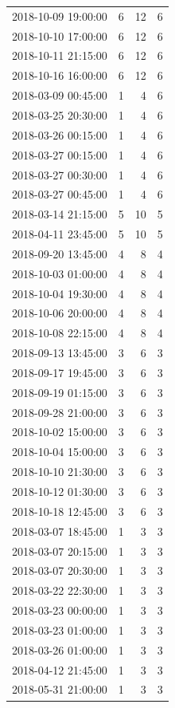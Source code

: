 \begin{tabular}{lrrr}
2018-10-09 19:00:00 & 6 & 12 & 6 \\
2018-10-10 17:00:00 & 6 & 12 & 6 \\
2018-10-11 21:15:00 & 6 & 12 & 6 \\
2018-10-16 16:00:00 & 6 & 12 & 6 \\
2018-03-09 00:45:00 & 1 & 4 & 6 \\
2018-03-25 20:30:00 & 1 & 4 & 6 \\
2018-03-26 00:15:00 & 1 & 4 & 6 \\
2018-03-27 00:15:00 & 1 & 4 & 6 \\
2018-03-27 00:30:00 & 1 & 4 & 6 \\
2018-03-27 00:45:00 & 1 & 4 & 6 \\
2018-03-14 21:15:00 & 5 & 10 & 5 \\
2018-04-11 23:45:00 & 5 & 10 & 5 \\
2018-09-20 13:45:00 & 4 & 8 & 4 \\
2018-10-03 01:00:00 & 4 & 8 & 4 \\
2018-10-04 19:30:00 & 4 & 8 & 4 \\
2018-10-06 20:00:00 & 4 & 8 & 4 \\
2018-10-08 22:15:00 & 4 & 8 & 4 \\
2018-09-13 13:45:00 & 3 & 6 & 3 \\
2018-09-17 19:45:00 & 3 & 6 & 3 \\
2018-09-19 01:15:00 & 3 & 6 & 3 \\
2018-09-28 21:00:00 & 3 & 6 & 3 \\
2018-10-02 15:00:00 & 3 & 6 & 3 \\
2018-10-04 15:00:00 & 3 & 6 & 3 \\
2018-10-10 21:30:00 & 3 & 6 & 3 \\
2018-10-12 01:30:00 & 3 & 6 & 3 \\
2018-10-18 12:45:00 & 3 & 6 & 3 \\
2018-03-07 18:45:00 & 1 & 3 & 3 \\
2018-03-07 20:15:00 & 1 & 3 & 3 \\
2018-03-07 20:30:00 & 1 & 3 & 3 \\
2018-03-22 22:30:00 & 1 & 3 & 3 \\
2018-03-23 00:00:00 & 1 & 3 & 3 \\
2018-03-23 01:00:00 & 1 & 3 & 3 \\
2018-03-26 01:00:00 & 1 & 3 & 3 \\
2018-04-12 21:45:00 & 1 & 3 & 3 \\
2018-05-31 21:00:00 & 1 & 3 & 3 \\

\end{tabular}
